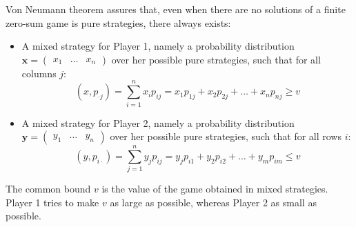 Von Neumann theorem assures that, even when there are no solutions of a finite zero-sum game is pure strategies, there always exists: 
\begin{itemize}
    \item A mixed strategy for Player 1, namely a probability distribution $\mathbf{x}=\begin{pmatrix}x_1 & \dots & x_n\end{pmatrix}$ over her possible pure strategies, such that for all columns $j$: 
        \[(x,p_{\cdot j})=\sum_{i=1}^nx_ip_{ij}=x_1p_{1j}+x_2p_{2j}+\dots+x_np_{nj}\geq v\]
     \item A mixed strategy for Player 2, namely a probability distribution $\mathbf{y}=\begin{pmatrix}y_1 & \dots & y_n\end{pmatrix}$ over her possible pure strategies, such that for all rows $i$: 
        \[(y,p_{i\cdot})=\sum_{j=1}^ny_jp_{ij}=y_jp_{i1}+y_2p_{i2}+\dots+y_mp_{im}\leq v\]
\end{itemize}
The common bound $v$ is the value of the game obtained in mixed strategies. 
Player 1 tries to make $v$ as large as possible, whereas Player 2 as small as possible. 